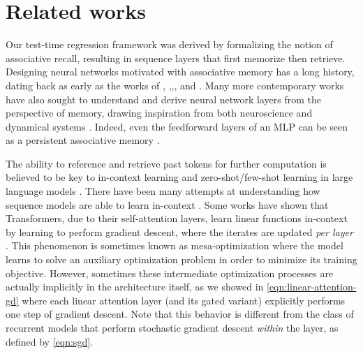 \documentclass[notitlepage, 11pt]{article}
\begin{document}
\section{Related works}\label{sec:related-works}
Our test-time regression framework was derived by formalizing the notion of associative recall, resulting in sequence layers that first memorize then retrieve.
Designing neural networks motivated with associative memory has a long history, dating back as early as the works of \citet{Hopfield1982NeuralNetworksPhysical}, \citet{Willshaw1969NonHolographicAssociativeMemory},\citet{Willshaw1989HolographyAssociativeMemory},\citet{Kohonen1972CorrelationMatrixMemories}, and \citet{Hinton1989ParallelModelsAssociative}.
Many more contemporary works have also sought to understand and derive neural network layers from the perspective of memory, drawing inspiration from both neuroscience and dynamical systems \citep{Bietti2023BirthTransformerMemory,Krotov2016DenseAssociativeMemory,Krotov2021LargeAssociativeMemory, Ramsauer2020HopfieldNetworksAll,Millidge2022UniversalHopfieldNetworks,Behrouz2024TitansLearningMemorize}.
Indeed, even the feedforward layers of an MLP can be seen as a persistent associative memory \citep{Sukhbaatar2019AugmentingSelfattentionPersistent,Zhang2025MemoryMosaics,Bietti2023BirthTransformerMemory,Nichani2024UnderstandingFactualRecall,Cabannes2023ScalingLawsAssociative}.

The ability to reference and retrieve past tokens for further computation is believed to be key to in-context learning and zero-shot/few-shot learning in large language models \citep{Olsson2022ContextLearningInduction,Dong2024SurveyIncontextLearning}.
There have been many attempts at understanding how sequence models are able to learn in-context \citep{Garg2022WhatCanTransformers,Zhang2023WhatHowDoes}.
Some works have shown that Transformers, due to their self-attention layers, learn linear functions in-context by learning to perform gradient descent, where the iterates are updated \emph{per layer} \citep{Oswald2023TransformersLearnInContext,Ahn2023TransformersLearnImplement}.
This phenomenon is sometimes known as mesa-optimization \citep{vonOswald2023UncoveringMesaoptimizationAlgorithms} where the model learns to solve an auxiliary optimization problem in order to minimize its training objective.
However, sometimes these intermediate optimization processes are actually implicitly in the architecture itself, as we showed in \autoref{eqn:linear-attention-gd} where each linear attention layer (and its gated variant) explicitly performs one step of gradient descent. 
Note that this behavior is different from the class of recurrent models that perform stochastic gradient descent \emph{within} the layer, as defined by \autoref{eqn:sgd}.
\end{document}
